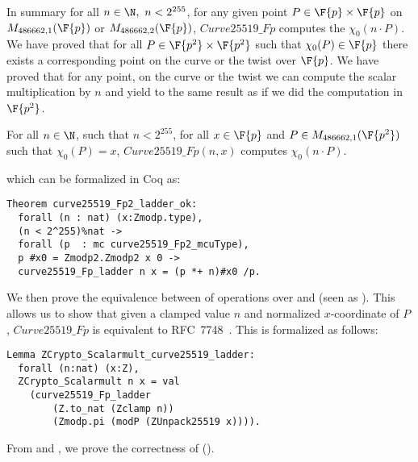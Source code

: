 In summary for all $n \in \N,\ n < 2^{255}$, for any given point $P\in\F{p}\times\F{p}$
on $M_{486662,1}(\F{p})$ or $M_{486662,2}(\F{p})$, $Curve25519\_Fp$
computes the $\chi_0(n \cdot P)$.
We have proved that for all $P \in \F{p^2}\times\F{p^2}$ such that $\chi_0(P) \in \F{p}$
there exists a corresponding point on the curve or the twist over $\F{p}$.
We have proved that for any point, on the curve or the twist we can compute the
scalar multiplication by $n$ and yield to the same result as if we did the
computation in $\F{p^2}$.
\begin{theorem}
  \label{thm:general-scalarmult}
  For all $n \in \N$, such that $n < 2^{255}$,
  for all $x \in \F{p}$ and $P \in M_{486662,1}(\F{p^2})$ such that $\chi_0(P) = x$,
  $Curve25519\_Fp(n,x)$ computes $\chi_0(n \cdot P)$.
\end{theorem}
which can be formalized in Coq as:
\begin{lstlisting}[language=Coq]
Theorem curve25519_Fp2_ladder_ok:
  forall (n : nat) (x:Zmodp.type),
  (n < 2^255)%nat ->
  forall (p  : mc curve25519_Fp2_mcuType),
  p #x0 = Zmodp2.Zmodp2 x 0 ->
  curve25519_Fp_ladder n x = (p *+ n)#x0 /p.
\end{lstlisting}

We then prove the equivalence between of operations over  and  (seen as \Zfield).
This allows us to show that given a clamped value $n$ and normalized $x$-coordinate of $P$,
$Curve25519\_Fp$ is equivalent to RFC~7748~\cite{rfc7748}. This is formalized as follows:
\begin{lstlisting}[language=Coq]
Lemma ZCrypto_Scalarmult_curve25519_ladder:
  forall (n:nat) (x:Z),
  ZCrypto_Scalarmult n x = val
    (curve25519_Fp_ladder
        (Z.to_nat (Zclamp n))
        (Zmodp.pi (modP (ZUnpack25519 x)))).
\end{lstlisting}

From  and , we prove the correctness
of  ().
